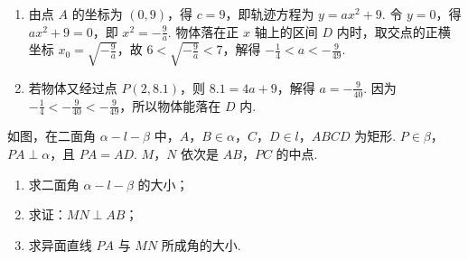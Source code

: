 \begin{solution}
\begin{enumerate}
\item 由点 \(A\) 的坐标为 \((0,9)\)，得 \(c=9\)，即轨迹方程为 \(y=ax^{2}+9\). 令 \(y=0\)，得 \(ax^{2}+9=0\)，即 \(x^{2}=-\frac{9}{a}\). 物体落在正 \(x\) 轴上的区间 \(D\) 内时，取交点的正横坐标 \(x_{0}=\sqrt{-\frac{9}{a}}\)，故 \(6<\sqrt{-\frac{9}{a}}<7\)，解得 \(-\frac{1}{4}<a<-\frac{9}{49}\).
\item 若物体又经过点 \(P(2,8.1)\)，则 \(8.1=4a+9\)，解得 \(a=-\frac{9}{40}\). 因为 \(-\frac{1}{4}<-\frac{9}{40}<-\frac{9}{49}\)，所以物体能落在 \(D\) 内.
\end{enumerate}
\end{solution}

\begin{problem}
如图，在二面角 \(\alpha-l-\beta\) 中，\(A\)，\(B\in\alpha\)，\(C\)，\(D\in l\)，\(ABCD\) 为矩形. \(P\in\beta\)，\(PA\perp\alpha\)，且 \(PA=AD\). \(M\)，\(N\) 依次是 \(AB\)，\(PC\) 的中点.

\begin{enumerate}
\item 求二面角 \(\alpha-l-\beta\) 的大小；
\item 求证：\(MN\perp AB\)；
\item 求异面直线 \(PA\) 与 \(MN\) 所成角的大小.
\end{enumerate}

\FloatBarrier
\end{problem}


